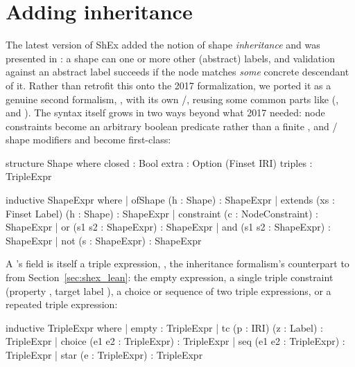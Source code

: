 \section{Adding inheritance} \label{sec:inheritance}

 
The latest version of ShEx added the notion of shape \emph{inheritance} and was presented in \cite{ShExInheritance}:
a shape can  one or more other (abstract) labels,
and validation against an abstract label succeeds 
if the node matches \emph{some} concrete
descendant of it. 
Rather than retrofit this onto the 2017 formalization, 
we ported it as a genuine second formalism, 
, 
with its own /, 
reusing some common parts like  
(,  and ).
The syntax itself grows in two ways beyond what 2017 needed: node
constraints become an arbitrary boolean predicate rather than a finite
, and 
/ shape modifiers and
 become first-class:

\begin{leanlisting}
structure Shape where
  closed : Bool
  extra  : Option (Finset IRI)
  triples : TripleExpr

inductive ShapeExpr where
  | ofShape (h : Shape) : ShapeExpr
  | extends (xs : Finset Label) (h : Shape) : ShapeExpr
  | constraint (c : NodeConstraint) : ShapeExpr
  | or (s1 s2 : ShapeExpr) : ShapeExpr
  | and (s1 s2 : ShapeExpr) : ShapeExpr
  | not (s : ShapeExpr) : ShapeExpr
\end{leanlisting}

A 's  field is itself a triple expression,
, the inheritance formalism's counterpart to
 from Section~\ref{sec:shex_lean}: the empty expression, a
single triple constraint (property , target label ), a
choice or sequence of two triple expressions, or a repeated triple
expression:

\begin{leanlisting}
inductive TripleExpr where
  | empty  : TripleExpr
  | tc (p : IRI) (z : Label) : TripleExpr
  | choice (e1 e2 : TripleExpr) : TripleExpr
  | seq (e1 e2 : TripleExpr) : TripleExpr
  | star (e : TripleExpr) : TripleExpr
\end{leanlisting}

